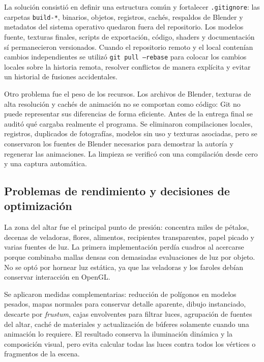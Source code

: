 \documentclass[letter,12pt]{article}
\begin{document}
	La solución consistió en definir una estructura común y fortalecer \texttt{.gitignore}: las carpetas \texttt{build-*}, binarios, objetos, registros, cachés, respaldos de Blender y metadatos del sistema operativo quedaron fuera del repositorio. Los modelos fuente, texturas finales, scripts de exportación, código, shaders y documentación sí permanecieron versionados. Cuando el repositorio remoto y el local contenían cambios independientes se utilizó \texttt{git pull --rebase} para colocar los cambios locales sobre la historia remota, resolver conflictos de manera explícita y evitar un historial de fusiones accidentales.

	Otro problema fue el peso de los recursos. Los archivos de Blender, texturas de alta resolución y cachés de animación no se comportan como código: Git no puede representar sus diferencias de forma eficiente. Antes de la entrega final se auditó qué cargaba realmente el programa. Se eliminaron compilaciones locales, registros, duplicados de fotografías, modelos sin uso y texturas asociadas, pero se conservaron los fuentes de Blender necesarios para demostrar la autoría y regenerar las animaciones. La limpieza se verificó con una compilación desde cero y una captura automática.

	\subsection{Problemas de rendimiento y decisiones de optimización}
	La zona del altar fue el principal punto de presión: concentra miles de pétalos, decenas de veladoras, flores, alimentos, recipientes transparentes, papel picado y varias fuentes de luz. La primera implementación perdía cuadros al acercarse porque combinaba mallas densas con demasiadas evaluaciones de luz por objeto. No se optó por hornear luz estática, ya que las veladoras y los faroles debían conservar interacción en OpenGL.

	Se aplicaron medidas complementarias: reducción de polígonos en modelos pesados, mapas normales para conservar detalle aparente, dibujo instanciado, descarte por \textit{frustum}, cajas envolventes para filtrar luces, agrupación de fuentes del altar, caché de materiales y actualización de búferes solamente cuando una animación lo requiere. El resultado conserva la iluminación dinámica y la composición visual, pero evita calcular todas las luces contra todos los vértices o fragmentos de la escena.
\end{document}
